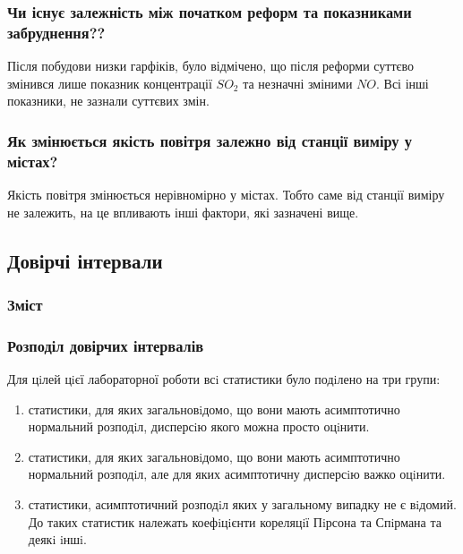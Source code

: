 \documentclass{beamer}
\begin{document}
\begin{frame}
  \frametitle{Чи існує залежність між початком реформ та показниками забруднення??}

  Після побудови низки гарфіків, було відмічено, що після реформи суттєво змінився 
  лише показник концентрації $SO_2$ та незначні зміними $NO$. Всі інші показники, не зазнали суттєвих змін.
  
\end{frame}

\begin{frame}
  \frametitle{Як змінюється якість повітря залежно від станції виміру у містах?}

  Якість повітря змінюється нерівномірно у містах. Тобто саме від станції виміру не залежить, 
    на це впливають інші фактори, які зазначені вище.

\end{frame}


\begin{frame}
  \section{Довірчі інтервали}

  \frametitle{Зміст}
  \tableofcontents[currentsection]
\end{frame}

\begin{frame}
  \frametitle{Розподіл довірчих інтервалів}

  Для цiлей цiєї лабораторної роботи всi статистики було подiлено на три групи:
  \begin{enumerate}
    \renewcommand{\theenumi}{\Roman{enumi}}
    \item  статистики, для яких загальновiдомо, що вони мають асимптотично нормальний розподiл,
    дисперсiю якого можна просто оцiнити. 
     
    \item статистики, для яких загальновiдомо, що вони мають асимптотично нормальний розподiл, але для
    яких асимптотичну дисперсiю важко оцiнити. 

    \item  статистики, асимптотичний розподiл яких у загальному випадку не є вiдомий. До таких статистик
    належать коефiцiєнти кореляцiї Пiрсона та Спiрмана та деякi iншi.
  \end{enumerate}
\end{frame} 
\end{document}
